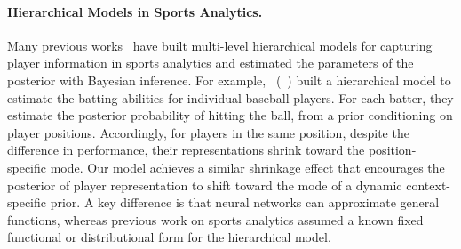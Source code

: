 \documentclass{article}
\begin{document}
\paragraph{Hierarchical Models in Sports Analytics.}
Many previous works~\cite{Gelman06,davis2015simulator}
have built multi-level hierarchical models for capturing player information in sports analytics and estimated the parameters of the posterior with Bayesian inference.
For example, ~\citeauthor{kruschke2014doing}(~\citeyear{kruschke2014doing}) built a hierarchical model to estimate the batting abilities for individual baseball players.
For each batter, they estimate the posterior probability of hitting the ball, from a prior conditioning on player positions.
Accordingly, for players in the same position, despite the difference in performance, their representations shrink toward the position-specific mode. 
Our model achieves a similar shrinkage effect that encourages the posterior of player representation to shift toward the mode of a dynamic context-specific prior. A key difference is that neural networks can approximate general functions, whereas previous work on sports analytics assumed a known fixed functional or distributional form for the hierarchical model.
\end{document}
